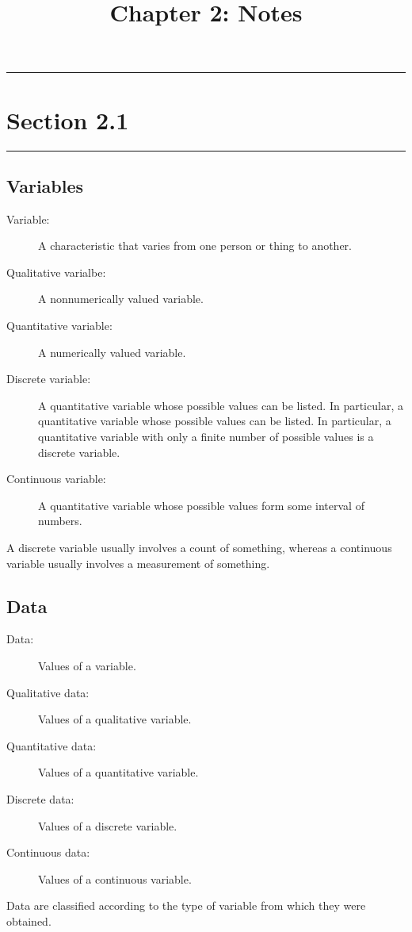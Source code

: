 \documentclass[12pt]{article}
\title{Chapter 2: Notes}
\author{}
\begin{document}
    \maketitle

    \noindent\rule{\textwidth}{0.4pt}
    \section*{Section 2.1}
    \noindent\rule{\textwidth}{0.4pt}
        \subsection*{Variables}
            \begin{description}
                \item[Variable:] A characteristic that varies from one person or thing to
                another.
                \item[Qualitative varialbe:] A nonnumerically valued variable.
                \item[Quantitative variable:] A numerically valued variable.
                \item[Discrete variable:] A quantitative variable whose possible values can
                be listed. In particular, a quantitative variable whose possible values can
                be listed. In particular, a quantitative variable with only a finite number
                of possible values is a discrete variable.
                \item[Continuous variable:] A quantitative variable whose possible values
                form some interval of numbers.    
            \end{description}
            A discrete variable usually involves a count of something, whereas a continuous
            variable usually involves a measurement of something.

        \subsection*{Data}
            \begin{description}
                \item[Data:] Values of a variable.
                \item[Qualitative data:] Values of a qualitative variable.
                \item[Quantitative data:] Values of a quantitative variable.
                \item[Discrete data:] Values of a discrete variable.
                \item[Continuous data:] Values of a continuous variable.    
            \end{description}
            Data are classified according to the type of variable from which they were
            obtained.
            
\end{document}
